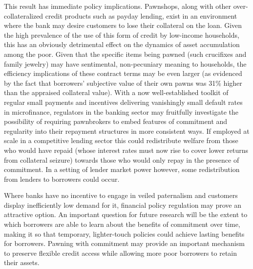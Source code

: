 \documentclass[oneside,11pt]{article}
\begin{document}
This result has immediate policy implications.  Pawnshops, along with other over-collateralized credit products such as payday lending, exist in an environment where the bank may desire customers to lose their collateral on the loan. Given the high prevalence of the use of this form of credit by low-income households, this has an obviously detrimental effect on the dynamics of asset accumulation among the poor.  Given that the specific items being pawned (such crucifixes and family jewelry) may have sentimental, non-pecuniary meaning to households, the efficiency implications of these contract terms may be even larger (as evidenced by the fact that borrowers' subjective value of their own pawns was 31\% higher than the appraised collateral value). With a now well-established toolkit of regular small payments and incentives delivering vanishingly small default rates in microfinance, regulators in the banking sector may fruitfully investigate the possibility of requiring pawnbrokers to embed features of commitment and regularity into their repayment structures in more consistent ways.   If employed at scale in a competitive lending sector this could redistribute welfare from those who would have repaid (whose interest rates must now rise to cover lower returns from collateral seizure) towards those who would only repay in the presence of commitment. In a setting of lender market power however, some redistribution from lenders to borrowers could occur.

Where banks have no incentive to engage in veiled paternalism and customers display inefficiently low demand for it, financial policy regulation may prove an attractive option.  An important question for future research will be the extent to which borrowers are able to learn about the benefits of commitment over time, making it so that temporary, lighter-touch policies could achieve lasting benefits for borrowers.  Pawning with commitment may provide an important mechanism to preserve flexible credit access while allowing more poor borrowers to retain their assets.






\end{document}
